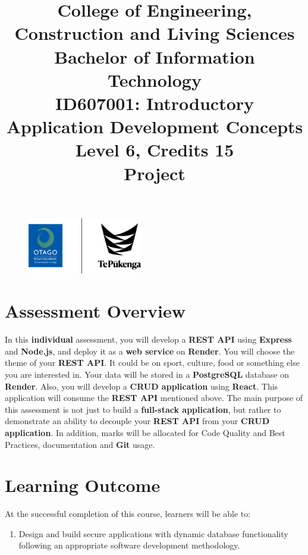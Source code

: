 \documentclass{article}
\author{}
\begin{document}
\begin{figure}
	\centering
	\includegraphics[width=50mm]{../img/logo.png}
\end{figure}

\title{College of Engineering, Construction and Living Sciences\\Bachelor of Information Technology\\ID607001: Introductory Application Development Concepts\\Level 6, Credits 15\\\textbf{Project}}
\date{}
\maketitle

\section*{Assessment Overview}
In this \textbf{individual} assessment, you will develop a \textbf{REST API} using \textbf{Express} and \textbf{Node.js}, and deploy it as a \textbf{web service} on \textbf{Render}. You will choose the theme of your \textbf{REST API}. It could be on sport, culture, food or something else you are interested in. Your data will be stored in a \textbf{PostgreSQL} database on \textbf{Render}. Also, you will develop a \textbf{CRUD application} using \textbf{React}. This application will consume the \textbf{REST API} mentioned above. The main purpose of this assessment is not just to build a \textbf{full-stack application}, but rather to demonstrate an ability to decouple your \textbf{REST API} from your \textbf{CRUD application}. In addition, marks will be allocated for Code Quality and Best Practices, documentation and \textbf{Git} usage.

\section*{Learning Outcome}
At the successful completion of this course, learners will be able to:
\begin{enumerate}
	\item Design and build secure applications with dynamic database functionality following an appropriate software development methodology.
\end{enumerate}
\end{document}
